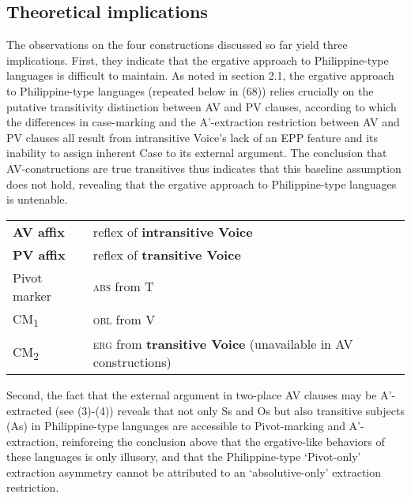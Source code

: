 \documentclass[10pt]{article}
\begin{document}
\subsection{Theoretical implications}
\noindent The observations on the four constructions discussed so far yield three implications. First, they indicate that the ergative approach to Philippine-type languages is difficult to maintain. As noted in section 2.1, the ergative approach to Philippine-type languages (repeated below in (68)) relies crucially on the putative transitivity distinction between AV and PV clauses, according to which the differences in case-marking and the A'-extraction restriction between AV and PV clauses all result from intransitive Voice's lack of an EPP feature and its inability to assign inherent Case to its external argument. The conclusion that AV-constructions are true transitives thus indicates that this baseline assumption does not hold, revealing that the  ergative approach to Philippine-type languages is untenable.  

\newpage

\begin{exe}
\vspace{-1mm}
\begin{table}[h]
\hspace{+1.2cm}\begin{tabular}{ll}
       \midrule
    \textbf{AV affix} & reflex of \textbf{intransitive Voice} \\
    \textbf{PV affix} & reflex of \textbf{transitive Voice} \\\midrule
    Pivot marker   & \textsc{abs} from T \\
    CM\textsubscript{1}   &  \textsc{obl} from V\\
    CM\textsubscript{2} &  \textsc{erg} from \textbf{transitive Voice} (unavailable in AV constructions) \\\midrule
   
\end{tabular}
\end{table}
\end{exe}

Second, the fact that the external argument in two-place AV clauses may be A'-extracted (see (3)-(4)) reveals that not only Ss and Os but also transitive subjects (As) in Philippine-type languages are accessible to Pivot-marking and A'-extraction, reinforcing the conclusion above that the   ergative-like behaviors of these languages is only illusory, and that the Philippine-type  `Pivot-only' extraction asymmetry cannot be attributed to an `absolutive-only' extraction restriction.  
\end{document}
